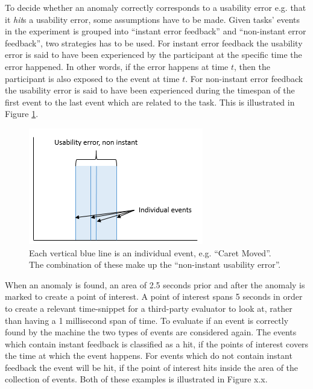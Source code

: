 To decide whether an anomaly correctly corresponds to a usability error e.g. that it \textit{hit}s a usability error, some assumptions have to be made. 
Given tasks' events in the experiment is grouped into ``instant error feedback'' and ``non-instant error feedback'', two strategies has to be used. 
For instant error feedback the usability error is said to have been experienced by the participant at the specific time the error happened. In other words, if the error happens at time $t$, then the participant is also exposed to the event at time $t$.
For non-instant error feedback the usability error is said to have been experienced during the timespan of the first event to the last event which are related to the task. This is illustrated in Figure \ref{[FIGURE] non-instant illustration}.
\begin{figure}
    \centering
  \includegraphics[width=0.75\columnwidth]{graphics/non-instant.png}
    \caption{Each vertical blue line is an individual event, e.g. ``Caret Moved''. The combination of these make up the ``non-instant usability error''. }
    \label{[FIGURE] non-instant illustration}
\end{figure}
When an anomaly is found, an area of 2.5 seconds prior and after the anomaly is marked to create a point of interest. 
A point of interest spans 5 seconds in order to create a relevant time-snippet for a third-party evaluator to look at, rather than having a 1 millisecond span of time.
To evaluate if an event is correctly found by the machine the two types of events are considered again.
The events which contain instant feedback is classified as a hit, if the points of interest covers the time at which the event happens.
For events which do not contain instant feedback the event will be hit, if the point of interest hits inside the area of the collection of events. Both of these examples is illustrated in Figure x.x. 

